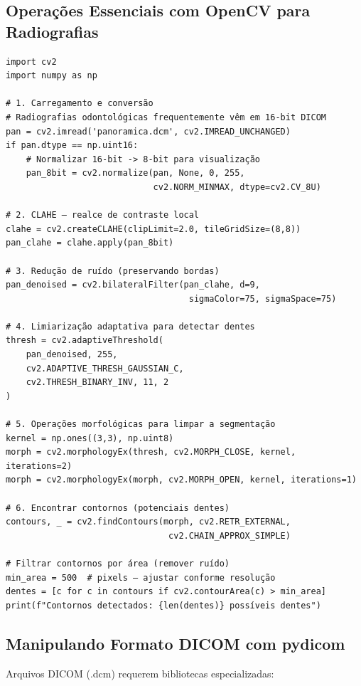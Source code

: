 \subsection{Operações Essenciais com OpenCV para Radiografias}

\begin{verbatim}
import cv2
import numpy as np

# 1. Carregamento e conversão
# Radiografias odontológicas frequentemente vêm em 16-bit DICOM
pan = cv2.imread('panoramica.dcm', cv2.IMREAD_UNCHANGED)
if pan.dtype == np.uint16:
    # Normalizar 16-bit -> 8-bit para visualização
    pan_8bit = cv2.normalize(pan, None, 0, 255,
                             cv2.NORM_MINMAX, dtype=cv2.CV_8U)

# 2. CLAHE — realce de contraste local
clahe = cv2.createCLAHE(clipLimit=2.0, tileGridSize=(8,8))
pan_clahe = clahe.apply(pan_8bit)

# 3. Redução de ruído (preservando bordas)
pan_denoised = cv2.bilateralFilter(pan_clahe, d=9,
                                    sigmaColor=75, sigmaSpace=75)

# 4. Limiarização adaptativa para detectar dentes
thresh = cv2.adaptiveThreshold(
    pan_denoised, 255,
    cv2.ADAPTIVE_THRESH_GAUSSIAN_C,
    cv2.THRESH_BINARY_INV, 11, 2
)

# 5. Operações morfológicas para limpar a segmentação
kernel = np.ones((3,3), np.uint8)
morph = cv2.morphologyEx(thresh, cv2.MORPH_CLOSE, kernel, iterations=2)
morph = cv2.morphologyEx(morph, cv2.MORPH_OPEN, kernel, iterations=1)

# 6. Encontrar contornos (potenciais dentes)
contours, _ = cv2.findContours(morph, cv2.RETR_EXTERNAL,
                                cv2.CHAIN_APPROX_SIMPLE)

# Filtrar contornos por área (remover ruído)
min_area = 500  # pixels — ajustar conforme resolução
dentes = [c for c in contours if cv2.contourArea(c) > min_area]
print(f"Contornos detectados: {len(dentes)} possíveis dentes")
\end{verbatim}

\subsection{Manipulando Formato DICOM com pydicom}

Arquivos DICOM (.dcm) requerem bibliotecas especializadas:

